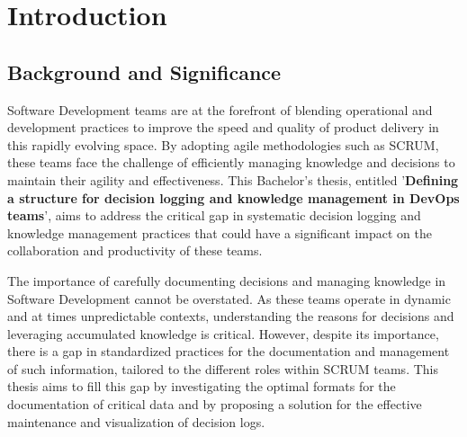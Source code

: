 



\chapter{Introduction} %
\label{Chapter1} %


\newcommand{\keyword}[1]{\textbf{#1}}
\newcommand{\tabhead}[1]{\textbf{#1}}
\newcommand{\code}[1]{\texttt{#1}}
\newcommand{\file}[1]{\texttt{\bfseries#1}}
\newcommand{\option}[1]{\texttt{\itshape#1}}





\section{Background and Significance}

Software Development teams are at the forefront of blending operational and development practices to improve the speed and quality of product delivery in this rapidly evolving space. By adopting agile methodologies such as SCRUM, these teams face the challenge of efficiently managing knowledge and decisions to maintain their agility and effectiveness. This Bachelor's thesis, entitled '\textbf{Defining a structure for decision logging and knowledge management in DevOps teams}', aims to address the critical gap in systematic decision logging and knowledge management practices that could have a significant impact on the collaboration and productivity of these teams.

The importance of carefully documenting decisions and managing knowledge in Software Development cannot be overstated. As these teams operate in dynamic and at times unpredictable contexts, understanding the reasons for decisions and leveraging accumulated knowledge is critical. However, despite its importance, there is a gap in standardized practices for the documentation and management of such information, tailored to the different roles within SCRUM teams. This thesis aims to fill this gap by investigating the optimal formats for the documentation of critical data and by proposing a solution for the effective maintenance and visualization of decision logs.

